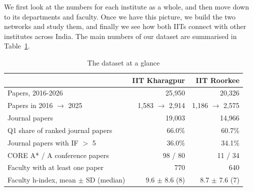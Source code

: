 \documentclass[conference,10pt]{IEEEtran}
\begin{document}
We first look at the numbers for each institute as a whole, and then move down to its departments and faculty. Once we
have this picture, we build the two networks and study them, and finally we see how both IITs connect with other
institutes across India. The main numbers of our dataset are summarised in Table~\ref{tab:glance}.

\begin{table}[!h]
\centering
\caption{The dataset at a glance}
\label{tab:glance}
\footnotesize
\setlength{\tabcolsep}{4pt}
\begin{tabular}{@{}lrr@{}}
\toprule
 & \textbf{IIT Kharagpur} & \textbf{IIT Roorkee} \\
\midrule
Papers, 2016-2026                 & 25,950 & 20,326 \\
Papers in 2016 $\rightarrow$ 2025  & 1,583 $\rightarrow$ 2,914 & 1,186 $\rightarrow$ 2,575 \\
Journal papers                     & 19,003 & 14,966 \\
Q1 share of ranked journal papers  & 66.0\% & 60.7\% \\
Journal papers with IF $>$ 5       & 36.0\% & 34.1\% \\
CORE A* / A conference papers      & 98 / 80 & 11 / 34 \\
Faculty with at least one paper    & 770 & 640 \\
Faculty h-index, mean $\pm$ SD (median) & 9.6 $\pm$ 8.6 (8) & 8.7 $\pm$ 7.6 (7) \\
\bottomrule
\end{tabular}
\end{table}
\end{document}
